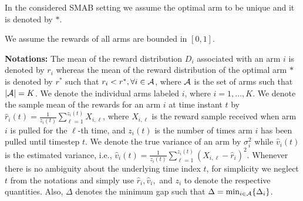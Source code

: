 \begin{assumption}
\label{SMAB:assm:1}
In the considered SMAB setting we assume the optimal arm to be unique and it is denoted by $*$.
\end{assumption}

\begin{assumption}
\label{SMAB:assm:2}
We assume the rewards of all arms are bounded in $[0,1]$.
\end{assumption}


\textbf{Notations:} The mean of the reward distribution $D_i$ associated with an arm $i$ is denoted by $r_i$ whereas the mean of the reward distribution of the optimal arm $*$ is denoted by $r^*$ such that $r_i < r^*, \forall i\in \mathcal{A}$, where $\mathcal{A}$ is the set of arms such that $|\mathcal{A}|=K$. We denote the individual arms labeled $i$, where  $i=1,\ldots,K$. We denote the sample mean of the rewards for an arm $i$ at time instant $t$ by $\hat{r}_{i}(t)=\frac{1}{z_{i}(t)}\sum_{\ell=1}^{z_i(t)} X_{i,\ell}$, where $X_{i,\ell}$ is the reward sample received when arm $i$ is pulled for the $\ell$-th time, and $z_i(t)$ is the number of times arm $i$ has been pulled until timestep $t$. We denote the true variance of an arm by $\sigma_i^{2}$ while $\hat{v}_{i}(t)$ is the estimated variance, i.e., $\hat{v}_{i}(t)=\frac{1}{z_i(t)}\sum_{\ell=1}^{z_{i}(t)}(X_{i,\ell}-\hat{r}_{i})^{2}$. Whenever there is no ambiguity about the underlying  time index $t$, for simplicity we neglect $t$ from the notations and simply use  $\hat{r}_i, \hat{v}_i,$ and $z_i$ to denote the respective quantities. Also, $\Delta$ denotes the minimum gap such that $\Delta=\min_{i\in\mathcal{A}}\lbrace \Delta_{i}\rbrace$.


